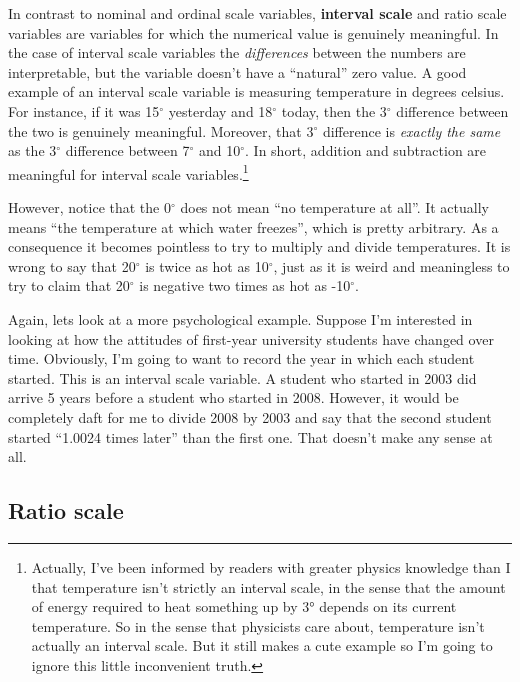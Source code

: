 \documentclass[
  a4paper,
]{book}
\begin{document}
In contrast to nominal and ordinal scale variables, \textbf{interval
scale} and ratio scale variables are variables for which the numerical
value is genuinely meaningful. In the case of interval scale variables
the \emph{differences} between the numbers are interpretable, but the
variable doesn't have a ``natural'' zero value. A good example of an
interval scale variable is measuring temperature in degrees celsius. For
instance, if it was 15\(^{\circ}\) yesterday and 18\(^{\circ}\) today,
then the 3\(^{\circ}\) difference between the two is genuinely
meaningful. Moreover, that 3\(^{\circ}\) difference is \emph{exactly the
same} as the 3\(^{\circ}\) difference between 7\(^{\circ}\) and
10\(^{\circ}\). In short, addition and subtraction are meaningful for
interval scale variables.\footnote{Actually, I've been informed by
  readers with greater physics knowledge than I that temperature isn't
  strictly an interval scale, in the sense that the amount of energy
  required to heat something up by 3° depends on its current
  temperature. So in the sense that physicists care about, temperature
  isn't actually an interval scale. But it still makes a cute example so
  I'm going to ignore this little inconvenient truth.}

However, notice that the 0\(^{\circ}\) does not mean ``no temperature at
all''. It actually means ``the temperature at which water freezes'',
which is pretty arbitrary. As a consequence it becomes pointless to try
to multiply and divide temperatures. It is wrong to say that
20\(^{\circ}\) is twice as hot as 10\(^{\circ}\), just as it is weird
and meaningless to try to claim that 20\(^{\circ}\) is negative two
times as hot as -10\(^{\circ}\).

Again, lets look at a more psychological example. Suppose I'm interested
in looking at how the attitudes of first-year university students have
changed over time. Obviously, I'm going to want to record the year in
which each student started. This is an interval scale variable. A
student who started in 2003 did arrive 5 years before a student who
started in 2008. However, it would be completely daft for me to divide
2008 by 2003 and say that the second student started ``1.0024 times
later'' than the first one. That doesn't make any sense at all.

\hypertarget{ratio-scale}{%
\subsection{Ratio scale}\label{ratio-scale}}
\end{document}
